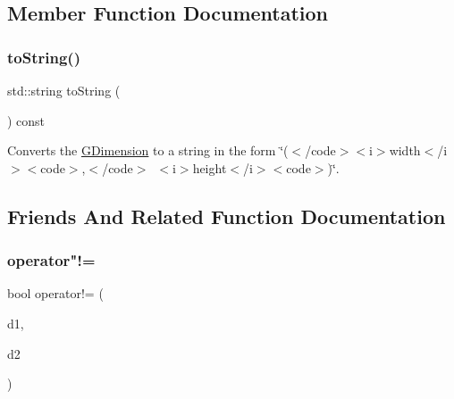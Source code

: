 \subsection{Member Function Documentation}
\mbox{\label{structsgl_1_1GDimension_a1fe5121d6528fdea3f243321b3fa3a49}} 
\subsubsection{\texorpdfstring{to\+String()}{toString()}}
{\footnotesize\ttfamily std\+::string to\+String (\begin{DoxyParamCaption}{ }\end{DoxyParamCaption}) const}



Converts the {\ttfamily \mbox{\hyperlink{structsgl_1_1GDimension}{G\+Dimension}}} to a string in the form {\ttfamily \char`\"{}($<$/code$>$$<$i$>$width$<$/i$>$$<$code$>$,$<$/code$>$~$<$i$>$height$<$/i$>$$<$code$>$)\char`\"{}}. 



\subsection{Friends And Related Function Documentation}
\mbox{\label{structsgl_1_1GDimension_a38754b56ceecfaa7cbf3947a19c8ceb6}} 
\subsubsection{\texorpdfstring{operator"!=}{operator!=}}
{\footnotesize\ttfamily bool operator!= (\begin{DoxyParamCaption}\item[{const \mbox{\hyperlink{structsgl_1_1GDimension}{G\+Dimension}} \&}]{d1,  }\item[{const \mbox{\hyperlink{structsgl_1_1GDimension}{G\+Dimension}} \&}]{d2 }\end{DoxyParamCaption})\hspace{0.3cm}{\ttfamily [friend]}}



